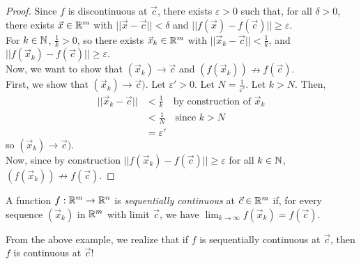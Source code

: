 \begin{proof}
Since $f$ is discontinuous at $\vec c$, there exists $\varepsilon > 0$ such that, for all $\delta > 0$, there exists $\vec x \in \mathbb{R}^m$ with $|| \vec x - \vec c|| < \delta$ and $||f(\vec x) - f(\vec c)|| \ge \varepsilon$. \\

For $k \in \mathbb{N}$, $\frac 1 k > 0$, so there exists $\vec x_k \in \mathbb{R}^m$ with $||\vec x_k - \vec c|| < \frac 1 k$, and $||f(\vec x_k) - f(\vec c)|| \ge \varepsilon$.\\

Now, we want to show that $(\vec x_k) \to \vec c$ and $(f(\vec x_k)) \nrightarrow f(\vec c)$.\\

First, we show that $(\vec x_k) \to \vec c)$. Let $\varepsilon' > 0$. Let $N = \frac{1}{\varepsilon'}$. Let $k > N$. Then,
\begin{align*}
    ||\vec x_k - \vec c|| &< \frac 1 k \quad \text{by construction of }\vec x_k \\
    &< \frac 1 N \quad \text{since } k > N\\
    &= \varepsilon'
\end{align*}
so $(\vec x_k) \to \vec c)$.\\

Now, since by construction $||f(\vec x_k) - f(\vec c)|| \ge \varepsilon$ for all $k \in \mathbb{N}$, $(f(\vec x_k)) \nrightarrow f(\vec c)$.
\end{proof}

\begin{definition}
A function $f : \mathbb{R}^m \to \mathbb{R}^n$ is \textit{sequentially continuous} at $\vec c \in \mathbb{R}^m$ if, for every sequence $(\vec x_k)$ in $\mathbb{R}^m$ with limit $\vec c$, we have $\lim_{k \to \infty} f(\vec x_k) = f(\vec c)$.
\end{definition}

From the above example, we realize that if $f$ is sequentially continuous at $\vec c$, then $f$ is continuous at $\vec c$!